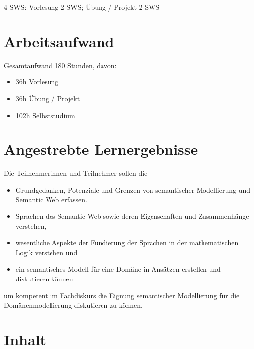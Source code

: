 4 SWS: Vorlesung 2 SWS; Übung / Projekt 2 SWS

\section*{Arbeitsaufwand\label{/mi-2017/modulbeschreibungen-master/MA_WTW_Modul_Logik-und-semantische-Modellierung}}\label{arbeitsaufwandpathlabelmi-2017modulbeschreibungen-mastermaux5fwtwux5fmodulux5flogik-und-semantische-modellierung}

Gesamtaufwand 180 Stunden, davon:

\begin{itemize}
\tightlist
\item
  36h Vorlesung
\item
  36h Übung / Projekt
\item
  102h Selbststudium
\end{itemize}

\section*{Angestrebte
Lernergebnisse\label{/mi-2017/modulbeschreibungen-master/MA_WTW_Modul_Logik-und-semantische-Modellierung}}\label{angestrebte-lernergebnissepathlabelmi-2017modulbeschreibungen-mastermaux5fwtwux5fmodulux5flogik-und-semantische-modellierung}

Die Teilnehmerinnen und Teilnehmer sollen die

\begin{itemize}
\tightlist
\item
  Grundgedanken, Potenziale und Grenzen von semantischer Modellierung
  und Semantic Web erfassen.
\item
  Sprachen des Semantic Web sowie deren Eigenschaften und Zusammenhänge
  verstehen,
\item
  wesentliche Aspekte der Fundierung der Sprachen in der mathematischen
  Logik verstehen und
\item
  ein semantisches Modell für eine Domäne in Ansätzen erstellen und
  diskutieren können
\end{itemize}

um kompetent im Fachdiskurs die Eignung semantischer Modellierung für
die Domänenmodellierung diskutieren zu können.

\section*{Inhalt\label{/mi-2017/modulbeschreibungen-master/MA_WTW_Modul_Logik-und-semantische-Modellierung}}\label{inhaltpathlabelmi-2017modulbeschreibungen-mastermaux5fwtwux5fmodulux5flogik-und-semantische-modellierung}

